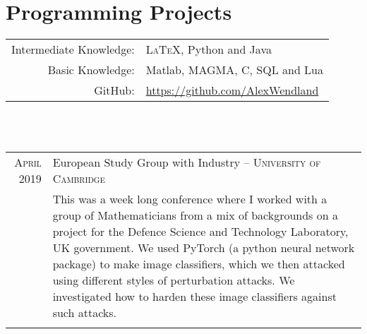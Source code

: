 \documentclass[a4paper,10pt]{article}
\begin{document}

\section{Programming Projects}
\begin{tabular}{rl}
	Intermediate Knowledge:&  \textsc{LaTeX}, Python and Java\\
	Basic Knowledge:& Matlab, \textsc{MAGMA}, C, SQL and Lua\\
	GitHub:& \href{https://github.com/AlexWendland}{https://github.com/AlexWendland}
\end{tabular}\\
\vspace{0.1 in}\\
\begin{tabular}{r|p{15.3cm}}
	\textsc{April 2019} & European Study Group with Industry -- \textsc{University of Cambridge} \\&\footnotesize{This was a week long conference where I worked with a group of Mathematicians from a mix of backgrounds on a project for the Defence Science and Technology Laboratory, UK government. We used PyTorch (a python neural network package) to make image classifiers, which we then attacked using different styles of perturbation attacks. We investigated how to harden these image classifiers against such attacks.}\\\multicolumn{2}{c}{} \\
\end{tabular}\\
\end{document}
